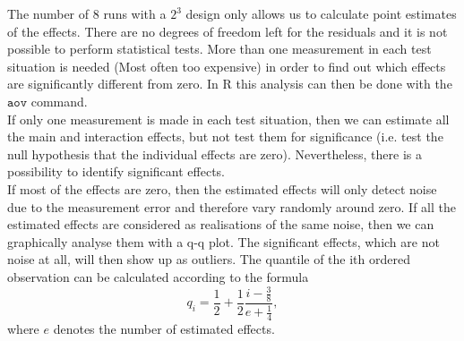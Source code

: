 The number of $8$ runs with a $2^3$ design only allows us to calculate point estimates of the effects. There are no degrees of freedom left for the residuals and it is not possible to perform statistical tests. More than one measurement in each test situation is needed (Most often too expensive) in order to find out which effects are significantly different from zero. In R this analysis can then be done with the $\texttt{aov}$ command.\\

If only one measurement is made in each test situation, then we can estimate all the main and interaction effects, but not test them for significance (i.e. test the null hypothesis that the individual effects are zero). Nevertheless, there is a possibility to identify significant effects.\\
If most of the effects are zero, then the estimated effects will only detect noise due to the measurement error and therefore vary randomly around zero. If all the estimated effects are considered as realisations of the same noise, then we can graphically analyse them with a q-q plot. The significant effects, which are not noise at all, will then show up as outliers. The quantile of the ith ordered observation can be calculated
according to the formula
\begin{equation}
  q_i = \frac{1}{2} + \frac{1}{2}\frac{i - \frac{3}{8}}{e + \frac{1}{4}},
\end{equation}
where $e$ denotes the number of estimated effects.
